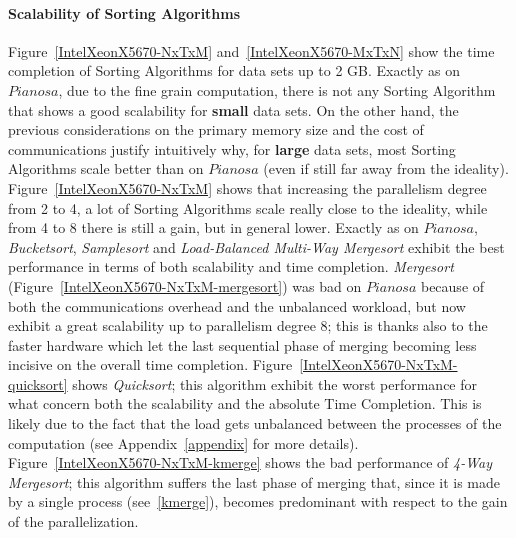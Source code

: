 \paragraph{Scalability of Sorting Algorithms} Figure~\ref{IntelXeonX5670-NxTxM} and~\ref{IntelXeonX5670-MxTxN} show the time completion of Sorting Algorithms for data sets up to 2 GB. Exactly as on $Pianosa$, due to the fine grain computation, there is not any Sorting Algorithm that shows a good scalability for \textbf{small} data sets. On the other hand, the previous considerations on the primary memory size and the cost of communications justify intuitively why, for \textbf{large} data sets, most Sorting Algorithms scale better than on $Pianosa$ (even if still far away from the ideality). Figure~\ref{IntelXeonX5670-NxTxM} shows that increasing the parallelism degree from 2 to 4, a lot of Sorting Algorithms scale really close to the ideality, while from 4 to 8 there is still a gain, but in general lower. Exactly as on $Pianosa$, \textit{Bucketsort}, \textit{Samplesort} and \textit{Load-Balanced Multi-Way Mergesort} exhibit the best performance in terms of both scalability and time completion. \textit{Mergesort} (Figure~\ref{IntelXeonX5670-NxTxM-mergesort}) was bad on $Pianosa$ because of both the communications overhead and the unbalanced workload, but now exhibit a great scalability up to parallelism degree 8; this is thanks also to the faster hardware which let the last sequential phase of merging becoming less incisive on the overall time completion. Figure~\ref{IntelXeonX5670-NxTxM-quicksort} shows \textit{Quicksort}; this algorithm exhibit the worst performance for what concern both the scalability and the absolute Time Completion. This is likely due to the fact that the load gets unbalanced between the processes of the computation (see Appendix~\ref{appendix} for more details). Figure~\ref{IntelXeonX5670-NxTxM-kmerge} shows the bad performance of \textit{4-Way Mergesort}; this algorithm suffers the last phase of merging that, since it is made by a single process (see~\ref{kmerge}), becomes predominant with respect to the gain of the parallelization. 

